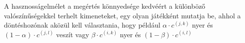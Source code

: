 \documentclass[a4paper,12pt]{article}
\begin{document}




A hasznosságelmélet a megértés könnyedsége kedvéért a különböző valószínűségekkel terhelt kimeneteket, egy olyan játékként mutatja be, ahhol a döntéshozónak aközül kell választania, hogy például $\alpha \cdot c^{(j,k)}$ nyer és $(1-\alpha) \cdot c^{(j,l)}$ veszít vagy $\beta \cdot c^{(i,k)}$ nyer és $(1-\beta) \cdot c^{(i,l)}$
\end{document}

